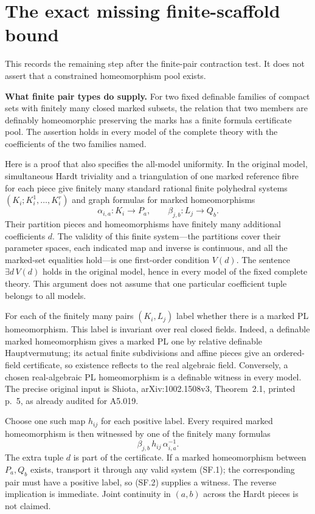 \section*{The exact missing finite-scaffold bound}

This records the remaining step after the finite-pair contraction test.
It does not assert that a constrained homeomorphism pool exists.

\textbf{What finite pair types do supply.}
For two fixed definable families of compact sets with finitely many
closed marked subsets, the relation that two members are definably
homeomorphic preserving the marks has a finite formula certificate pool.
The assertion holds in every model of the complete theory with the
coefficients of the two families named.

Here is a proof that also specifies the all-model uniformity. In the
original model, simultaneous Hardt triviality and a triangulation of one
marked reference fibre for each piece give finitely many standard
rational finite polyhedral systems $(K_i;K_i^1,\ldots,K_i^r)$ and graph
formulas for marked homeomorphisms
\[
 \alpha_{i,a}:K_i\longrightarrow P_a,\qquad
 \beta_{j,b}:L_j\longrightarrow Q_b.
 \tag{SF.1}
\]
Their partition pieces and homeomorphisms have finitely many additional
coefficients $d$. The validity of this finite system---the partitions
cover their parameter spaces, each indicated map and inverse is
continuous, and all the marked-set equalities hold---is one first-order
condition $V(d)$. The sentence $\exists d\,V(d)$ holds in the original
model, hence in every model of the fixed complete theory. This argument
does not assume that one particular coefficient tuple belongs to all
models.

For each of the finitely many pairs $(K_i,L_j)$ label whether there is a
marked PL homeomorphism. This label is invariant over real closed
fields. Indeed, a definable marked homeomorphism gives a marked PL one
by relative definable Hauptvermutung; its actual finite subdivisions and
affine pieces give an ordered-field certificate, so existence reflects
to the real algebraic field. Conversely, a chosen real-algebraic PL
homeomorphism is a definable witness in every model. The precise original
input is Shiota, arXiv:1002.1508v3, Theorem~2.1, printed p.~5, as already
audited for A5.019.

Choose one such map $h_{ij}$ for each positive label. Every required
marked homeomorphism is then witnessed by one of the finitely many
formulas
\[
              \beta_{j,b}\,h_{ij}\,\alpha_{i,a}^{-1}.
 \tag{SF.2}
\]
The extra tuple $d$ is part of the certificate. If a marked homeomorphism
between $P_a,Q_b$ exists, transport it through any valid system (SF.1);
the corresponding pair must have a positive label, so (SF.2) supplies a
witness. The reverse implication is immediate. Joint continuity in
$(a,b)$ across the Hardt pieces is not claimed.

